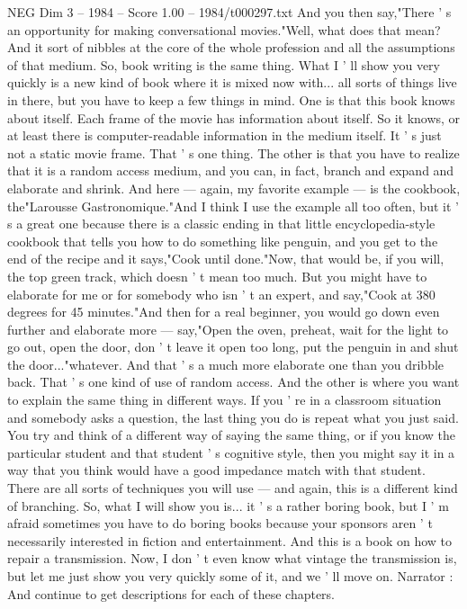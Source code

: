 \begin{textsample}{NEG Dim 3 – 1984 – Score 1.00 – 1984/t000297.txt}
And you then say,"There ' s an opportunity for making conversational movies."Well, what does that mean?
And it sort of nibbles at the core of the whole profession and all the assumptions of that medium.
So, book writing is the same thing.
What I ' ll show you very quickly is a new kind of book where it is mixed now with... all sorts of things live in there, but you have to keep a few things in mind.
One is that this book knows about itself.
Each frame of the movie has information about itself.
So it knows, or at least there is computer-readable information in the medium itself.
It ' s just not a static movie frame.
That ' s one thing.
The other is that you have to realize that it is a random access medium, and you can, in fact, branch and expand and elaborate and shrink.
And here — again, my favorite example — is the cookbook, the"Larousse Gastronomique."And I think I use the example all too often, but it ' s a great one because there is a classic ending in that little encyclopedia-style cookbook that tells you how to do something like penguin, and you get to the end of the recipe and it says,"Cook until done."Now, that would be, if you will, the top green track, which doesn ' t mean too much.
But you might have to elaborate for me or for somebody who isn ' t an expert, and say,"Cook at 380 degrees for 45 minutes."And then for a real beginner, you would go down even further and elaborate more — say,"Open the oven, preheat, wait for the light to go out, open the door, don ' t leave it open too long, put the penguin in and shut the door..."whatever.
And that ' s a much more elaborate one than you dribble back.
That ' s one kind of use of random access.
And the other is where you want to explain the same thing in different ways.
If you ' re in a classroom situation and somebody asks a question, the last thing you do is repeat what you just said.
You try and think of a different way of saying the same thing, or if you know the particular student and that student ' s cognitive style, then you might say it in a way that you think would have a good impedance match with that student.
There are all sorts of techniques you will use — and again, this is a different kind of branching.
So, what I will show you is... it ' s a rather boring book, but I ' m afraid sometimes you have to do boring books because your sponsors aren ' t necessarily interested in fiction and entertainment.
And this is a book on how to repair a transmission.
Now, I don ' t even know what vintage the transmission is, but let me just show you very quickly some of it, and we ' ll move on.
Narrator : And continue to get descriptions for each of these chapters.

\end{textsample}
